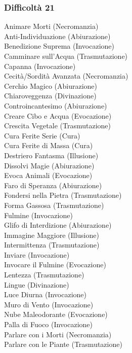 \begin{multicols}{3}
	\subsubsection{Difficoltà 21}
	Animare Morti (Necromanzia)\\
	Anti-Individuazione (Abiurazione)\\
	Benedizione Suprema (Invocazione)\\
	Camminare sull'Acqua (Trasmutazione)\\
	Capanna (Invocazione)\\
	Cecità/Sordità Avanzata (Necromanzia)\\
	Cerchio Magico (Abiurazione)\\
	Chiaroveggenza (Divinazione)\\
	Controincantesimo (Abiurazione)\\
	Creare Cibo e Acqua (Evocazione)\\
	Crescita Vegetale (Trasmutazione)\\
	Cura Ferite Serie (Cura)\\
	Cura Ferite di Massa (Cura)\\
	Destriero Fantasma (Illusione)\\
	Dissolvi Magie (Abiurazione)\\
	Evoca Animali (Evocazione)\\
	Faro di Speranza (Abiurazione)\\
	Fondersi nella Pietra (Trasmutazione)\\
	Forma Gassosa (Trasmutazione)\\
	Fulmine (Invocazione)\\
	Glifo di Interdizione (Abiurazione)\\
	Immagine Maggiore (Illusione)\\
	Intermittenza (Trasmutazione)\\
	Inviare (Invocazione)\\
	Invocare il Fulmine (Evocazione)\\
	Lentezza (Trasmutazione)\\
	Lingue (Divinazione)\\
	Luce Diurna (Invocazione)\\
	Muro di Vento (Invocazione)\\
	Nube Maleodorante (Evocazione)\\
	Palla di Fuoco (Invocazione)\\
	Parlare con i Morti (Necromanzia)\\
	Parlare con le Piante (Trasmutazione)\\

\end{multicols}
